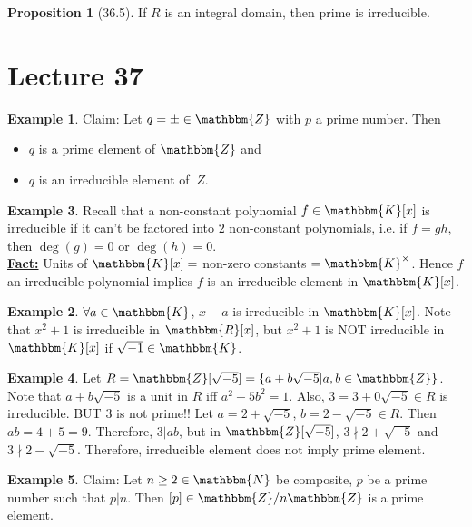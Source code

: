 \documentclass{article}
\newcommand{\N}{\mathbbm{N}}
\newcommand{\Z}{\mathbbm{Z}}
\newcommand{\R}{\mathbbm{R}}
\newcommand{\define}[1]{\textbf{\underline{#1}}}
\theoremstyle{definition}
\newtheorem*{prop}{Proposition}
\newtheorem*{ex}{Example}
\theoremstyle{remark}
\newcommand{\K}{\mathbbm{K}}
\begin{document}
{{            \begin{prop}[36.5]
                If $R$ is an integral domain, then prime is irreducible.
            \end{prop}
        }
    }
    \section*{Lecture 37}{
        \begin{ex}
            Claim: Let $q=\pm \in \Z$ with $p$ a prime number. Then
            \begin{itemize}
                \item $q$ is a prime element of $\Z$ and
                \item $q$ is an irreducible element of $\
                Z$.
            \end{itemize}
        \end{ex}
        
        \begin{ex}
            Recall that a non-constant polynomial $f \in \K[x]$ is irreducible if it can't be factored into $2$ non-constant polynomials, i.e. if $f=gh$, then $\deg(g)=0$ or $\deg(h)=0$.\\
            \define{Fact:} Units of $\K[x]=$ non-zero constants $=\K^\times$. Hence $f$ an irreducible polynomial implies $f$ is an irreducible element in $\K[x]$.
            \begin{ex}
                $\forall a\in \K$, $x-a$ is irreducible in $\K[x]$. Note that $x^2+1$ is irreducible in $\R[x]$, but $x^2+1$ is NOT irreducible in $\K[x]$ if $\sqrt{-1}\in \K$.
            \end{ex}
        \end{ex}
        
        \begin{ex}
            Let $R=\Z[\sqrt{-5}]=\{a+b\sqrt{-5}|a,b \in \Z\}$. Note that $a+b\sqrt{-5}$ is a unit in $R$ iff $a^2+5b^2=1$. Also, $3=3+0\sqrt{-5}\in R$ is irreducible. BUT $3$ is not prime!! Let $a=2+\sqrt{-5}$, $b=2-\sqrt{-5} \in R$. Then $ab=4+5=9$. Therefore, $3|ab$, but in $\Z[\sqrt{-5}]$, $3\nmid 2+\sqrt{-5}$ and $3\nmid 2-\sqrt{-5}$. Therefore, irreducible element does not imply prime element.
        \end{ex}
        
        \begin{ex}
            Claim: Let $n\geq 2 \in \N$ be composite, $p$ be a prime number such that $p|n$. Then $[p]\in \Z/n\Z$ is a prime element.
        \end{ex}
    }
\end{document}
